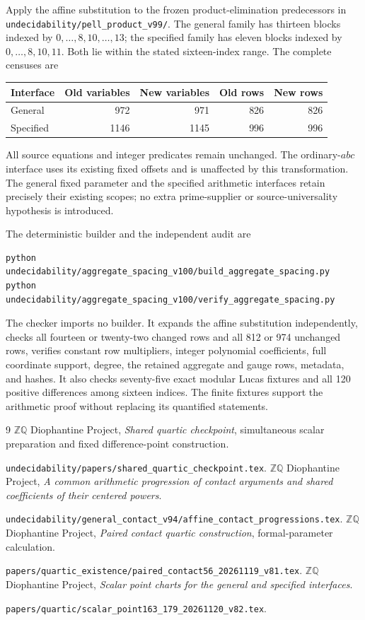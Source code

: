 \documentclass[11pt]{article}
\begin{document}
Apply the affine substitution to the frozen product-elimination
predecessors in
\nolinkurl{undecidability/pell_product_v99/}. The general family has
thirteen blocks indexed by \(0,\ldots,8,10,\ldots,13\); the
specified family has eleven blocks indexed by
\(0,\ldots,8,10,11\). Both lie within the stated sixteen-index
range. The complete censuses are
\begin{center}
\begin{tabular}{lrrrr}
\toprule
Interface & Old variables & New variables & Old rows & New rows\\
\midrule
General & 972 & 971 & 826 & 826\\
Specified & 1146 & 1145 & 996 & 996\\
\bottomrule
\end{tabular}
\end{center}
All source equations and integer predicates remain unchanged. The
ordinary-\(abc\) interface uses its existing fixed offsets and is
unaffected by this transformation. The general fixed parameter and
the specified arithmetic interfaces retain precisely their existing
scopes; no extra prime-supplier or source-universality hypothesis is
introduced.

The deterministic builder and the independent audit are
\begin{verbatim}
python undecidability/aggregate_spacing_v100/build_aggregate_spacing.py
python undecidability/aggregate_spacing_v100/verify_aggregate_spacing.py
\end{verbatim}
The checker imports no builder. It expands the affine substitution
independently, checks all fourteen or twenty-two changed rows and
all 812 or 974 unchanged rows, verifies constant row multipliers,
integer polynomial coefficients, full coordinate support, degree,
the retained aggregate and gauge rows, metadata, and hashes. It also
checks seventy-five exact modular Lucas fixtures and all 120 positive
differences among sixteen indices. The finite fixtures support the
arithmetic proof without replacing its quantified statements.

\begin{thebibliography}{9}
\small\setlength{\itemsep}{2pt}
 \(\mathbb Z\mathbb Q\) Diophantine Project,
\emph{Shared quartic checkpoint}, simultaneous scalar preparation and
fixed difference-point construction.
\par\nolinkurl{undecidability/papers/shared_quartic_checkpoint.tex}.
 \(\mathbb Z\mathbb Q\) Diophantine Project,
\emph{A common arithmetic progression of contact arguments and shared
coefficients of their centered powers}.
\par\nolinkurl{undecidability/general_contact_v94/affine_contact_progressions.tex}.
 \(\mathbb Z\mathbb Q\) Diophantine Project,
\emph{Paired contact quartic construction}, formal-parameter calculation.
\par\nolinkurl{papers/quartic_existence/paired_contact56_20261119_v81.tex}.
 \(\mathbb Z\mathbb Q\) Diophantine Project,
\emph{Scalar point charts for the general and specified interfaces}.
\par\nolinkurl{papers/quartic/scalar_point163_179_20261120_v82.tex}.
\end{thebibliography}
\end{document}
